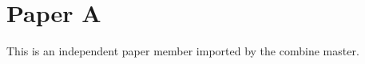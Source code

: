 \documentclass{article}
\begin{document}
\section{Paper A}
This is an independent paper member imported by the combine master.
\end{document}
